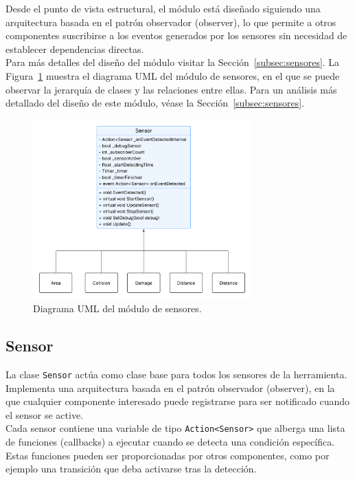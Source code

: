 Desde el punto de vista estructural, el módulo está diseñado siguiendo una arquitectura basada en el patrón observador (observer), lo que permite a otros componentes suscribirse a los eventos generados por los sensores sin necesidad de establecer dependencias directas.\\


Para más detalles del diseño del módulo visitar la Sección~\ref{subsec:sensores}.
La Figura~\ref{fig:UML_SensorModule} muestra el diagrama UML del módulo de sensores, en el que se puede observar la jerarquía de clases y las relaciones entre ellas. 
Para un análisis más detallado del diseño de este módulo, véase la Sección~\ref{subsec:sensores}.

\begin{figure}[t]
	\centering
	\includegraphics[width=0.75\textwidth]{Imagenes/UMLSensor.png}
	\caption{Diagrama UML del módulo de sensores.}
	\label{fig:UML_SensorModule}
\end{figure}

\subsection{Sensor}
La clase \texttt{Sensor} actúa como clase base para todos los sensores de la herramienta. Implementa una arquitectura basada en el patrón observador (observer), en la que cualquier componente interesado puede registrarse para ser notificado cuando el sensor se active.\\

Cada sensor contiene una variable de tipo \texttt{Action<Sensor>} que alberga una lista de funciones (callbacks) a ejecutar cuando se detecta una condición específica. Estas funciones pueden ser proporcionadas por otros componentes, como por ejemplo una transición que deba activarse tras la detección.\\

